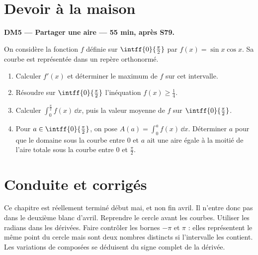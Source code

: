 \mxnewpage
\section{Devoir à la maison}\textbf{DM5 --- Partager une aire --- 55 min, après S79.}\par On considère la fonction $f$ définie sur $\intff{0}{\frac\pi2}$ par $f(x)=\sin x\cos x$. Sa courbe est représentée dans un repère orthonormé.
\begin{enumerate}\item Calculer $f' (x)$ et déterminer le maximum de $f$ sur cet intervalle.
\item Résoudre sur $\intff{0}{\frac\pi2}$ l'inéquation $f(x)\ge\frac14$.
\item Calculer $\displaystyle\int_0^{\frac{\pi}{2}}f(x)\,\dd x$, puis la valeur moyenne de $f$ sur $\intff{0}{\frac\pi2}$.
\item Pour $a\in\intff{0}{\frac\pi2}$, on pose $A(a)=\displaystyle\int_0^a f(x)\,\dd x$. Déterminer $a$ pour que le domaine sous la courbe entre $0$ et $a$ ait une aire égale à la moitié de l'aire totale sous la courbe entre $0$ et $\frac\pi2$.\end{enumerate}

\ifmxteacher\mxnewpage\section{Conduite et corrigés}\begin{teachernote}Ce chapitre est réellement terminé début mai, et non fin avril. Il n'entre donc pas dans le deuxième blanc d'avril. Reprendre le cercle avant les courbes. Utiliser les radians dans les dérivées. Faire contrôler les bornes $-\pi$ et $\pi$ : elles représentent le même point du cercle mais sont deux nombres distincts si l'intervalle les contient. Les variations de composées se déduisent du signe complet de la dérivée.\end{teachernote}

